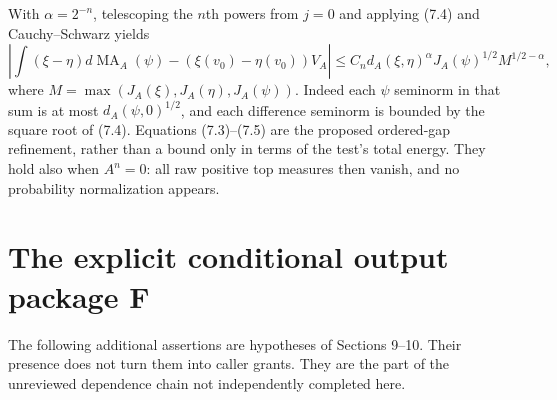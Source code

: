 \documentclass[10pt]{article}
\newcommand{\MA}{\operatorname{MA}}
\begin{document}
With $\alpha=2^{-n}$, telescoping the $n$th powers from $j=0$ and
applying (7.4) and Cauchy--Schwarz yields
\[
 \left|\int(\xi-\eta)d\MA_A(\psi)
       -(\xi(v_0)-\eta(v_0))V_A\right|
 \leq C_n d_A(\xi,\eta)^\alpha J_A(\psi)^{1/2}
       M^{1/2-\alpha},
\tag{7.5}
\]
where $M=\max(J_A(\xi),J_A(\eta),J_A(\psi))$.
Indeed each $\psi$ seminorm in that sum is at most
$d_A(\psi,0)^{1/2}$, and each difference seminorm is bounded by
the square root of (7.4). Equations (7.3)--(7.5) are the proposed
ordered-gap refinement, rather than a bound only in terms of the test's
total energy. They hold also when $A^n=0$: all raw positive top measures
then vanish, and no probability normalization appears.

\section{The explicit conditional output package F}
The following additional assertions are hypotheses of Sections 9--10.
Their presence does not turn them into caller grants. They are the part
of the unreviewed dependence chain not independently completed here.
\end{document}
